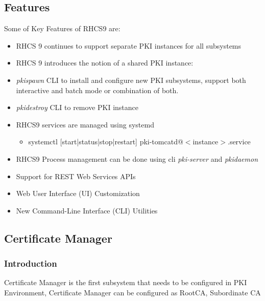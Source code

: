 \documentclass[12pt]{report}
\begin{document}
\subsection{Features}
    Some of Key Features of RHCS9 are: 
    \begin{itemize}
        \item RHCS 9 continues to support separate PKI instances for all subsystems
        \item RHCS 9 introduces the notion of a shared PKI instance:
        \item \textit{pkispawn} CLI to install and configure new PKI subsystems, support both 
            interactive and batch mode or combination of both.
        \item \textit{pkidestroy} CLI to remove PKI instance
        \item RHCS9 services are managed using systemd 
            \begin{itemize}
                \item systemctl [start|status|stop|restart] pki-tomcatd@$<$instance$>$.service
            \end{itemize}
        \item RHCS9 Process management can be done using cli \textit{pki-server} and \textit{pkidaemon}
        \item Support for REST Web Services APIs
        \item Web User Interface (UI) Customization
        \item New Command-Line Interface (CLI) Utilities
    \end{itemize}
\subsection{Certificate Manager}
\subsubsection{Introduction}
Certificate Manager is the first subsystem that needs to be configured in PKI Environment, Certificate Manager can be configured as RootCA, Subordinate CA
\end{document}
